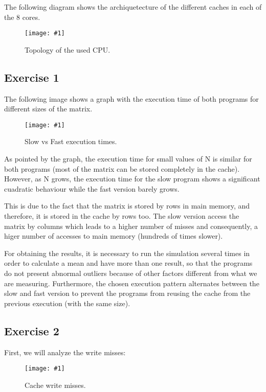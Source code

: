\documentclass{article}
\newcommand{\myFigure}[4]{%
    \begin{figure}[!ht]
        \texttt{[image: \#1]}
        \centering
        \caption{#2}
        \label{#3}
    \end{figure}
}
\begin{document}
The following diagram shows the archiquetecture of the different caches in each of the 8 cores. 

\myFigure{../material_P3/out0/mv/figure.png}{Topology of the used CPU.}{topology}{0.34}

\pagebreak

\subsection*{Exercise 1}

The following image shows a graph with the execution time of both programs for different sizes of the matrix.

\myFigure{../material_P3/out1/mv_att4/slow_fast_time.png}{Slow vs Fast execution times.}{slow_fast_times}{0.65}

As pointed by the graph, the execution time for small values of N is similar for both programs (most of the matrix can be stored completely in the cache). However, as N grows, the execution time for the slow program shows a significant cuadratic behaviour while the fast version barely grows.

This is due to the fact that the matrix is stored by rows in main memory, and therefore, it is stored in the cache by rows too. The slow version access the matrix by columns which leads to a higher number of misses and consequently, a higer number of accesses to main memory (hundreds of times slower). 

For obtaining the results, it is necessary to run the simulation several times in order to calculate a mean and have more than one result, so that the programs do not present abnormal outliers because of other factors different from what we are measuring. Furthermore, the chosen execution pattern alternates between the slow and fast version to prevent the programs from reusing the cache from the previous execution (with the same size).

\pagebreak

\subsection*{Exercise 2}

First, we will analyze the write misses: 

\myFigure{../material_P3/out2/mv_att1/cache_escritura.png}{Cache write misses.}{cache_escritura}{0.55}
\end{document}
